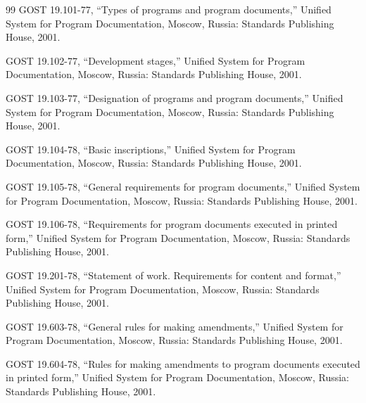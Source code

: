 \documentclass[12pt,a4paper]{extarticle}
\begin{document}
\renewcommand{\refname}{}
\begin{thebibliography}{99}
GOST 19.101-77, \enquote{Types of programs and program documents,} Unified System for Program Documentation, Moscow, Russia: Standards Publishing House, 2001.

GOST 19.102-77, \enquote{Development stages,} Unified System for Program Documentation, Moscow, Russia: Standards Publishing House, 2001.

GOST 19.103-77, \enquote{Designation of programs and program documents,} Unified System for Program Documentation, Moscow, Russia: Standards Publishing House, 2001.

GOST 19.104-78, \enquote{Basic inscriptions,} Unified System for Program Documentation, Moscow, Russia: Standards Publishing House, 2001.

GOST 19.105-78, \enquote{General requirements for program documents,} Unified System for Program Documentation, Moscow, Russia: Standards Publishing House, 2001.

GOST 19.106-78, \enquote{Requirements for program documents executed in printed form,} Unified System for Program Documentation, Moscow, Russia: Standards Publishing House, 2001.

GOST 19.201-78, \enquote{Statement of work. Requirements for content and format,} Unified System for Program Documentation, Moscow, Russia: Standards Publishing House, 2001.

GOST 19.603-78, \enquote{General rules for making amendments,} Unified System for Program Documentation, Moscow, Russia: Standards Publishing House, 2001.

GOST 19.604-78, \enquote{Rules for making amendments to program documents executed in printed form,} Unified System for Program Documentation, Moscow, Russia: Standards Publishing House, 2001.
\end{thebibliography}

\clearpage

\end{document}
